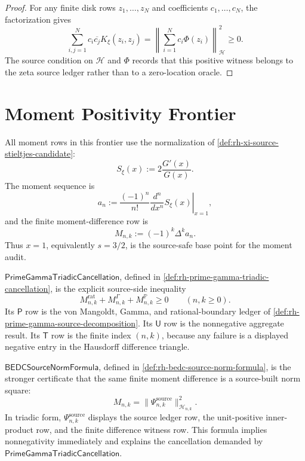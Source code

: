 \begin{proof}
For any finite disk rows $z_1,\ldots,z_N$ and coefficients
$c_1,\ldots,c_N$, the factorization gives
$$
\sum_{i,j=1}^{N}
c_i\overline{c_j}K_{\xi}(z_i,z_j)
=
\left\|
\sum_{i=1}^{N}c_i\Phi(z_i)
\right\|_{\mathcal H}^2
\ge0.
$$
The source condition on $\mathcal H$ and $\Phi$ records that this
positive witness belongs to the zeta source ledger rather than to a
zero-location oracle.
\end{proof}

\section{Moment Positivity Frontier}
\label{sec:rh-source-positive-moment-frontier}

\begin{definition}
\label{def:rh-normalized-xi-moment-frontier}
All moment rows in this frontier use the normalization of
\autoref{def:rh-xi-source-stieltjes-candidate}:
$$
S_{\xi}(x)
:=
2\frac{G'(x)}{G(x)}.
$$
The moment sequence is
$$
a_n
:=
\frac{(-1)^n}{n!}
\left.
\frac{d^n}{dx^n}S_{\xi}(x)
\right|_{x=1},
$$
and the finite moment-difference row is
$$
M_{n,k}
:=
(-1)^k\Delta^k a_n.
$$
Thus $x=1$, equivalently $s=3/2$, is the source-safe base point for the
moment audit.
\end{definition}

\begin{principle}
\label{prin:rh-prime-gamma-cancellation-frontier-role}
$\mathsf{PrimeGammaTriadicCancellation}$, defined in
\autoref{def:rh-prime-gamma-triadic-cancellation}, is the explicit
source-side inequality
$$
M_{n,k}^{\mathrm{rat}}
+
M_{n,k}^{\Gamma}
+
M_{n,k}^{\mathbb P}
\ge0
\qquad
(n,k\ge0).
$$
Its $\mathsf P$ row is the von Mangoldt, Gamma, and rational-boundary
ledger of \autoref{def:rh-prime-gamma-source-decomposition}. Its
$\mathsf U$ row is the nonnegative aggregate result. Its $\mathsf T$ row
is the finite index $(n,k)$, because any failure is a displayed negative
entry in the Hausdorff difference triangle.
\end{principle}

\begin{principle}
\label{prin:rh-bedc-source-norm-frontier-role}
$\mathsf{BEDCSourceNormFormula}$, defined in
\autoref{def:rh-bedc-source-norm-formula}, is the stronger certificate
that the same finite moment difference is a source-built norm square:
$$
M_{n,k}
=
\|\Psi_{n,k}^{\mathrm{source}}\|_{\mathcal H_{n,k}}^2.
$$
In triadic form, $\Psi_{n,k}^{\mathrm{source}}$ displays the source
ledger row, the unit-positive inner-product row, and the finite
difference witness row. This formula implies nonnegativity immediately
and explains the cancellation demanded by
$\mathsf{PrimeGammaTriadicCancellation}$.
\end{principle}

